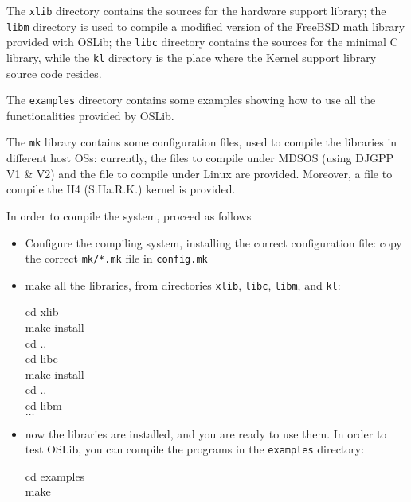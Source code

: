 \documentclass[a4paper]{report}
\begin{document}
The {\tt xlib} directory contains the sources for the hardware
support  library; the {\tt libm} directory is used to compile a
modified version of the FreeBSD math library provided with OSLib; the 
{\tt libc} directory contains the sources for the minimal C library, 
while the {\tt kl} directory is the place where the Kernel support library
source code resides.

The {\tt examples} directory contains some examples
showing how to use all the functionalities provided by OSLib.

The {\tt mk} library contains some configuration files, used to
compile the libraries in different host OSs: currently, the files
to compile under MDSOS (using DJGPP V1 \& V2) and the file to compile
under Linux are provided. Moreover, a file to compile the H4 (S.Ha.R.K.)
kernel is provided.

In order to compile the system, proceed as follows
\begin{itemize}
	\item Configure the compiling system, installing the 
		correct configuration file: copy the correct {\tt mk/*.mk}
		file in {\tt config.mk}
	\item make all the libraries, from directories {\tt xlib}, 
		{\tt libc}, {\tt libm}, and {\tt kl}:
		
		\begin{minipage}[t]{10cm}
		\begin{tt}
		\begin{tabbing}
		cd xlib					\\
		make install				\\
		cd ..					\\
		cd libc					\\
		make install				\\
		cd ..					\\
		cd libm					\\
		$\ldots$
		\end{tabbing}
		\end{tt}
		\end{minipage}
	\item now the libraries are installed, and you are ready to
		use them. In order to test OSLib, you can compile
		the programs in the {\tt examples} directory:

		\begin{minipage}[t]{10cm}
		\begin{tt}
		\begin{tabbing}
		cd examples				\\
		make
		\end{tabbing}
		\end{tt}
		\end{minipage}
\end{itemize}
\end{document}
